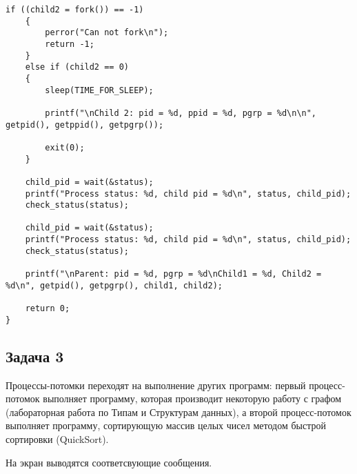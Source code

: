 \begin{lstlisting}[style={asm},label=lst:wait,caption=Вызов wait()]
    if ((child2 = fork()) == -1)
    {
        perror("Can not fork\n");
        return -1;
    }
    else if (child2 == 0)
    {
        sleep(TIME_FOR_SLEEP);

        printf("\nChild 2: pid = %d, ppid = %d, pgrp = %d\n\n", getpid(), getppid(), getpgrp());

        exit(0);
    }

    child_pid = wait(&status);
    printf("Process status: %d, child pid = %d\n", status, child_pid);
    check_status(status);

    child_pid = wait(&status);
    printf("Process status: %d, child pid = %d\n", status, child_pid);
    check_status(status);

    printf("\nParent: pid = %d, pgrp = %d\nChild1 = %d, Child2 = %d\n", getpid(), getpgrp(), child1, child2);

    return 0;
}
\end{lstlisting}


\clearpage

\subsection*{Задача 3} 
Процессы-потомки переходят на выполнение других программ: первый процесс-потомок выполняет программу, которая производит некоторую работу с графом (лабораторная работа по Типам и Структурам данных), а второй процесс-потомок выполняет программу, сортирующую массив целых чисел методом быстрой сортировки (QuickSort).

На экран выводятся соответсвующие сообщения.

